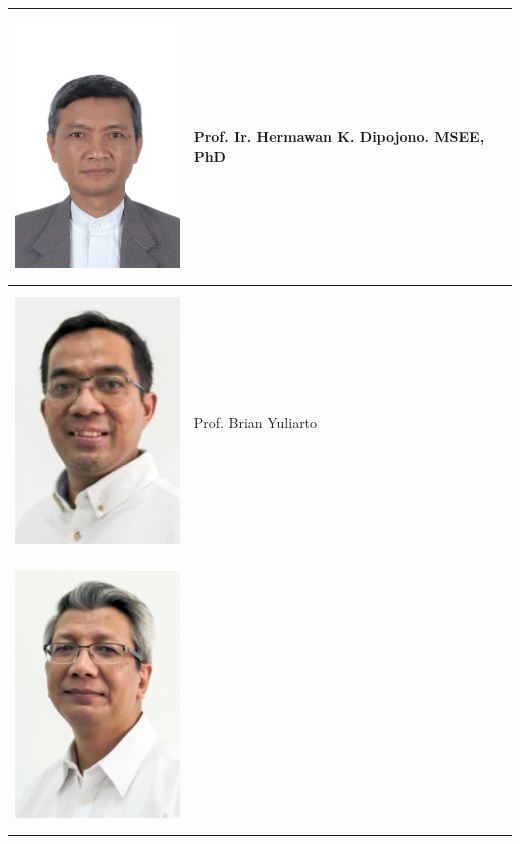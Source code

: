 \documentclass[a0,landscape]{a0poster}
\begin{document}
\begin{multicols}{3}

\begin{tcolorbox}[
  colback=blue!5,
  colframe=green!40!black,
  title=Anggota]
{\centering
\begin{tabular}{
|>{\centering\arraybackslash}m{8cm}
|>{\centering\arraybackslash}m{25cm}|}
\hline
\includegraphics[height=7cm]{HermawanKDipojono.png} &
Prof. Ir. Hermawan K. Dipojono. MSEE, PhD  \\
\hline
\includegraphics[height=7cm]{BrianYuliarto.png} &
Prof. Brian Yuliarto \\
\hline
\includegraphics[height=7cm]{AhmadNuruddin.png} &

\end{tabular}}
\end{tcolorbox}
\end{multicols}
\end{document}
